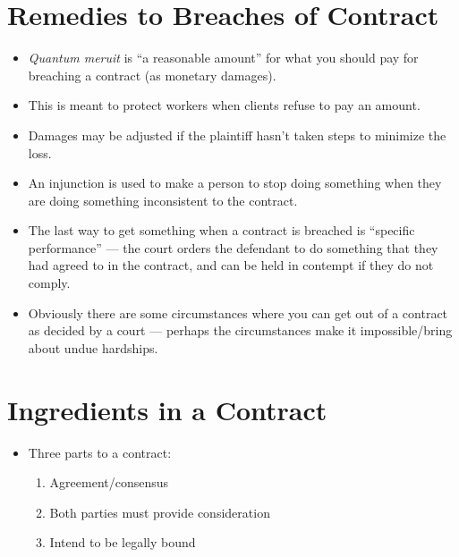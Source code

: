 \documentclass{article}
\begin{document}
\section{Remedies to Breaches of Contract}
\begin{itemize}
    \item \emph{Quantum meruit} is ``a reasonable amount'' for what you should pay for breaching a contract (as monetary damages).
    \item This is meant to protect workers when clients refuse to pay an amount.
    \item Damages may be adjusted if the plaintiff hasn't taken steps to minimize the loss.
    \item An injunction is used to make a person to stop doing something when they are doing something inconsistent to the contract.
    \item The last way to get something when a contract is breached is ``specific performance'' --- the court orders the defendant to do something that they had agreed to in the contract, and can be held in contempt if they do not comply.
    \item Obviously there are some circumstances where you can get out of a contract as decided by a court --- perhaps the circumstances make it impossible/bring about undue hardships.
\end{itemize}

\section{Ingredients in a Contract}
\begin{itemize}
    \item Three parts to a contract:
        \begin{enumerate}
            \item Agreement/consensus
            \item Both parties must provide consideration
            \item Intend to be legally bound
        \end{enumerate}
\end{itemize}
\end{document}
